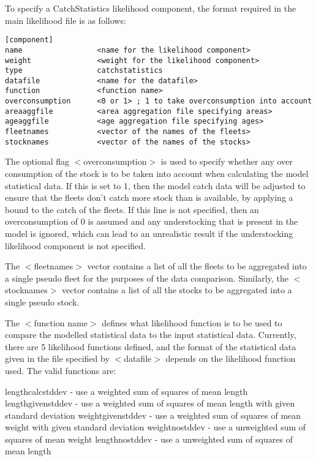 \documentclass[10pt,twoside]{book}
\begin{document}
\bigskip
To specify a CatchStatistics likelihood component, the format required in the main likelihood file is as follows:

{\small\begin{verbatim}
[component]
name                 <name for the likelihood component>
weight               <weight for the likelihood component>
type                 catchstatistics
datafile             <name for the datafile>
function             <function name>
overconsumption      <0 or 1> ; 1 to take overconsumption into account
areaaggfile          <area aggregation file specifying areas>
ageaggfile           <age aggregation file specifying ages>
fleetnames           <vector of the names of the fleets>
stocknames           <vector of the names of the stocks>
\end{verbatim}}

The optional flag $<$overconsumption$>$ is used to specify whether any over consumption of the stock is to be taken into account when calculating the model statistical data.  If this is set to 1, then the model catch data will be adjusted to ensure that the fleets don't catch more stock than is available, by applying a bound to the catch of the fleets.  If this line is not specified, then an overconsumption of 0 is assumed and any understocking that is present in the model is ignored, which can lead to an unrealistic result if the understocking likelihood component is not specified.

\bigskip
The $<$fleetnames$>$ vector contains a list of all the fleets to be aggregated into a single pseudo fleet for the purposes of the data comparison.  Similarly, the $<$stocknames$>$ vector contains a list of all the stocks to be aggregated into a single pseudo stock.

\bigskip
The $<$function name$>$ defines what likelihood function is to be used to compare the modelled statistical data to the input statistical data.  Currently, there are 5 likelihood functions defined, and the format of the statistical data given in the file specified by $<$datafile$>$ depends on the likelihood function used.  The valid functions are:

\bigskip
lengthcalcstddev - use a weighted sum of squares of mean length\newline
lengthgivenstddev - use a weighted sum of squares of mean length with given standard deviation\newline
weightgivenstddev - use a weighted sum of squares of mean weight with given standard deviation\newline
weightnostddev - use a unweighted sum of squares of mean weight\newline
lengthnostddev - use a unweighted sum of squares of mean length
\end{document}
